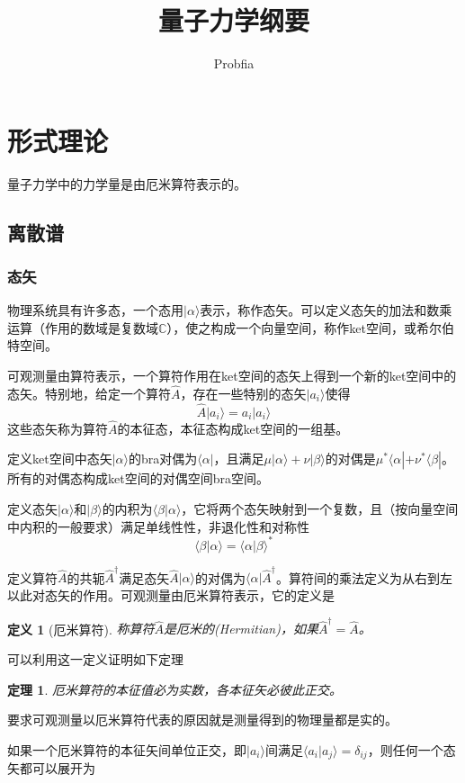 \documentclass[a4paper,11pt]{ctexart}
\title{量子力学纲要}
\author{Probfia}
\date{}
\newcommand{\beq}{\begin{equation}}
\newcommand{\eeq}{\end{equation}}
\newcommand{\complexs}{\mathbb{C}}
\newcommand{\state}[1]{| #1 \rangle}
\newtheorem{thm}{定理}[section]
\newtheorem{dfn}{定义}[section]
\begin{document}
\maketitle
\tableofcontents
\section{形式理论}
量子力学中的力学量是由厄米算符表示的。
\subsection{离散谱}
\subsubsection{态矢}
物理系统具有许多态，一个态用$|\alpha \rangle$表示，称作态矢。可以定义态矢的加法和数乘运算（作用的数域是复数域$\complexs$），使之构成一个向量空间，称作ket空间，或希尔伯特空间。
\par
可观测量由算符表示，一个算符作用在ket空间的态矢上得到一个新的ket空间中的态矢。特别地，给定一个算符$\hat{A}$，存在一些特别的态矢$|a_i\rangle$使得
\beq
\hat{A} | a_i \rangle = a_i | a_i \rangle
\eeq
这些态矢称为算符$\hat{A}$的本征态，本征态构成ket空间的一组基。
\par
定义ket空间中态矢$| \alpha \rangle$的bra对偶为$\langle \alpha |$，且满足$\mu \state{\alpha} + \nu \state{\beta}$的对偶是$\mu^* \langle \alpha | + \nu^* \langle \beta |$。所有的对偶态构成ket空间的对偶空间bra空间。
\par
定义态矢$\state{\alpha}$和$\state{\beta}$的内积为$\langle \beta | \alpha \rangle$，它将两个态矢映射到一个复数，且（按向量空间中内积的一般要求）满足单线性性，非退化性和对称性
\beq
\langle \beta | \alpha \rangle = \langle \alpha | \beta \rangle^*
\eeq
\par
定义算符$\hat{A}$的共轭$\hat{A}^\dagger$满足态矢$\hat{A} \state{\alpha}$的对偶为$\langle \alpha | \hat{A}^\dagger$。算符间的乘法定义为从右到左以此对态矢的作用。可观测量由厄米算符表示，它的定义是
\begin{dfn}[厄米算符]
称算符$\hat{A}$是厄米的(Hermitian)，如果$\hat{A}^\dagger = \hat{A}$。
\end{dfn}
可以利用这一定义证明如下定理
\begin{thm}
厄米算符的本征值必为实数，各本征矢必彼此正交。
\end{thm}
要求可观测量以厄米算符代表的原因就是测量得到的物理量都是实的。\par
如果一个厄米算符的本征矢间单位正交，即$| a_i \rangle$间满足$\langle a_i | a_j \rangle = \delta_{ij}$，则任何一个态矢都可以展开为
\end{document}
